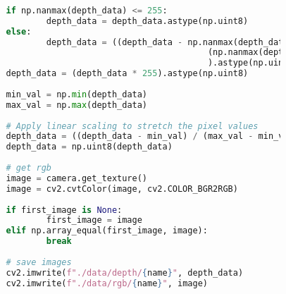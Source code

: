 \begin{lstlisting}[language=Python,caption=Capturing images from a file camera with depth image scaling using Ensenso Software from Optonic GmbH \cite{optonic}, label=lst:file-camera]
				
				if np.nanmax(depth_data) <= 255:
						depth_data = depth_data.astype(np.uint8)
				else:
						depth_data = ((depth_data - np.nanmax(depth_data)) / 
														(np.nanmax(depth_data) - np.nanmin(depth_data))
														).astype(np.uint8)
				depth_data = (depth_data * 255).astype(np.uint8)
				
				min_val = np.min(depth_data)
				max_val = np.max(depth_data)
				
				# Apply linear scaling to stretch the pixel values
				depth_data = ((depth_data - min_val) / (max_val - min_val)) * 255
				depth_data = np.uint8(depth_data)
				
				# get rgb
				image = camera.get_texture()
				image = cv2.cvtColor(image, cv2.COLOR_BGR2RGB)
				
				if first_image is None:
						first_image = image
				elif np.array_equal(first_image, image):
						break
				
				# save images
				cv2.imwrite(f"./data/depth/{name}", depth_data)
				cv2.imwrite(f"./data/rgb/{name}", image)
	\end{lstlisting}

	
